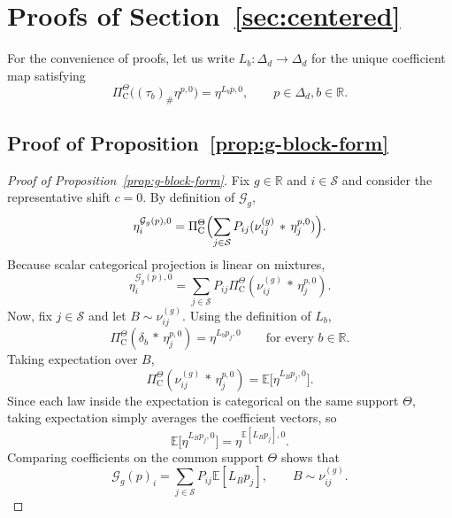\documentclass{article}
\newcommand{\X}{\mathcal{S}}
\newcommand{\R}{\mathbb{R}}
\newcommand{\E}{\mathbb{E}}
\begin{document}
\newpage
\section{Proofs of Section~\ref{sec:centered}}\label{app:B}
For the convenience of proofs, let us write $L_b : \Delta_d \to \Delta_d$ for the unique coefficient map satisfying
\begin{equation}
\Pi^\Theta_\mathrm C \bigl((\tau_b)_\# \eta^{p,0} \bigr) = \eta^{L_b p,0},\qquad p \in \Delta_d, b\in\R.
\end{equation}

\subsection{Proof of Proposition~\ref{prop:g-block-form}}
\begin{proof}[Proof of Proposition~\ref{prop:g-block-form}]
Fix $g \in \R$ and $i \in \X$ and consider the representative shift $c=0$. By definition of $\mathcal G_g$,
\begin{equation}
\eta^{\mathcal G_g(p), 0}_i = \Pi^\Theta_\mathrm C\Bigl(\sum_{j \in \X} P_{ij}(\nu^{(g)}_{ij}\,\ast\,\eta^{p, 0}_j) \Bigr).
\end{equation}
Because scalar categorical projection is linear on mixtures,
\begin{equation}
\eta^{\mathcal G_g(p), 0}_i = \sum_{j \in \X}P_{ij}\Pi^\Theta_\mathrm C (\nu^{(g)}_{ij}\,\ast\,\eta^{p, 0}_j).
\end{equation}
Now, fix $j \in \X$ and let $B\sim \nu^{(g)}_{ij}$. Using the definition of $L_b$,
\begin{equation}
\Pi^\Theta_\mathrm C(\delta_b \,\ast\,\eta^{p, 0}_j) = \eta^{L_bp_j, 0}\qquad \text{for every } b \in \R.
\end{equation}
Taking expectation over $B$,
\begin{equation}
\Pi^\Theta_\mathrm C(\nu^{(g)}_{ij} \,\ast\,\eta^{p, 0}_j) = \E\bigl[\eta^{L_Bp_j,0} \bigr].
\end{equation}
Since each law inside the expectation is categorical on the same support $\Theta$, taking expectation simply averages the coefficient vectors, so
\begin{equation}
\E\bigl[\eta^{L_Bp_j,0} \bigr] = \eta^{\E[L_B p_j],0}.
\end{equation}
Comparing coefficients on the common support $\Theta$ shows that
\begin{equation}
\mathcal G_g(p)_i = \sum_{j \in \X} P_{ij} \E[L_B p_j], \qquad B \sim \nu^{(g)}_{ij}.
\end{equation}
\end{proof}
\end{document}
